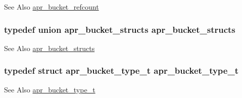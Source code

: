 \begin{DoxySeeAlso}{See Also}
\hyperlink{structapr__bucket__refcount}{apr\-\_\-bucket\-\_\-refcount} 
\end{DoxySeeAlso}
\hypertarget{group___a_p_r___util___bucket___brigades_ga3c0929c971f94de4521fb0fea6fd3209}{
\subsubsection[{apr\-\_\-bucket\-\_\-structs}]{\setlength{\rightskip}{0pt plus 5cm}typedef union {\bf apr\-\_\-bucket\-\_\-structs} {\bf apr\-\_\-bucket\-\_\-structs}}}\label{group___a_p_r___util___bucket___brigades_ga3c0929c971f94de4521fb0fea6fd3209}
\begin{DoxySeeAlso}{See Also}
\hyperlink{unionapr__bucket__structs}{apr\-\_\-bucket\-\_\-structs} 
\end{DoxySeeAlso}
\hypertarget{group___a_p_r___util___bucket___brigades_ga4a152aaf7d851c81af73b7e84dc1a8a2}{
\subsubsection[{apr\-\_\-bucket\-\_\-type\-\_\-t}]{\setlength{\rightskip}{0pt plus 5cm}typedef struct {\bf apr\-\_\-bucket\-\_\-type\-\_\-t} {\bf apr\-\_\-bucket\-\_\-type\-\_\-t}}}\label{group___a_p_r___util___bucket___brigades_ga4a152aaf7d851c81af73b7e84dc1a8a2}
\begin{DoxySeeAlso}{See Also}
\hyperlink{structapr__bucket__type__t}{apr\-\_\-bucket\-\_\-type\-\_\-t} 
\end{DoxySeeAlso}


